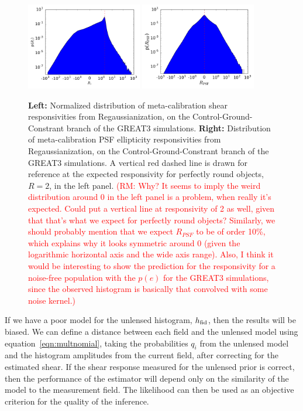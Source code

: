\documentclass[iop]{emulateapj}
\newcommand\rmcomment[1]{\textcolor{red}{(RM: #1)}}
\begin{document}
\begin{figure}
\begin{center}
\includegraphics[width=0.45\textwidth]{./Plots/R1_hist.pdf}
\includegraphics[width=0.45\textwidth]{./Plots/a1_hist.pdf}
\end{center}
\caption{{\bf Left:} Normalized distribution of meta-calibration shear
  responsivities from Regaussianization, on the
  Control-Ground-Constrant branch of the GREAT3 simulations.  {\bf
    Right:} Distribution of meta-calibration PSF ellipticity
  responsivities from Regaussianization, on the
  Control-Ground-Constrant branch of the GREAT3 simulations. A vertical
  red dashed line is drawn for reference at the expected
  responsivity for perfectly round objects, $R=2$, in the left panel. 
  \rmcomment{Why?  It seems to imply the weird distribution
    around 0 in the left panel is a problem, when really it's
    expected.  Could put a vertical line at responsivity of 2 as well,
    given that that's what we expect for perfectly round objects?
    Similarly, we should probably mention that we expect $R_{PSF}$ to
    be of order 10\%, which explains why it looks symmetric around 0
    (given the logarithmic horizontal axis and the wide axis range).
    Also, I think it would be interesting to show the prediction for
    the responsivity for a noise-free population with the $p(e)$ for
    the GREAT3 simulations, since the observed histogram is basically
    that convolved with some noise kernel.}}
\label{fig:calibhist}
\end{figure}

If we have a poor model for the unlensed histogram, $h_{\rm fid}$,
then the results will be biased. We can define a distance between each
field and the unlensed model using equation~\ref{eqn:multnomial},
taking the probabilities $q_i$ from the unlensed model and the
histogram amplitudes from the current field, after correcting for the
estimated shear. If the shear response measured for the unlensed prior
is correct, then the performance of the estimator will depend only on
the similarity of the model to the measurement field. The likelihood
can then be used as an objective criterion for the quality of the
inference.
\end{document}

